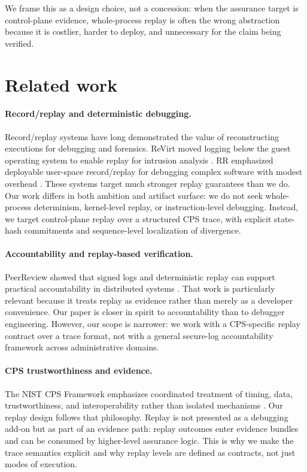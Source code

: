 \documentclass[11pt]{article}
\begin{document}
We frame this as a design choice, not a concession: when the assurance target is control-plane evidence, whole-process replay is often the wrong abstraction because it is costlier, harder to deploy, and unnecessary for the claim being verified.

\section{Related work}

\paragraph{Record/replay and deterministic debugging.}
Record/replay systems have long demonstrated the value of reconstructing executions for debugging and forensics. ReVirt moved logging below the guest operating system to enable replay for intrusion analysis \cite{dunlap2002revirt}. RR emphasized deployable user-space record/replay for debugging complex software with modest overhead \cite{ocallahan2017rr}. These systems target much stronger replay guarantees than we do. Our work differs in both ambition and artifact surface: we do not seek whole-process determinism, kernel-level replay, or instruction-level debugging. Instead, we target control-plane replay over a structured CPS trace, with explicit state-hash commitments and sequence-level localization of divergence.

\paragraph{Accountability and replay-based verification.}
PeerReview showed that signed logs and deterministic replay can support practical accountability in distributed systems \cite{haeberlen2007peerreview}. That work is particularly relevant because it treats replay as evidence rather than merely as a developer convenience. Our paper is closer in spirit to accountability than to debugger engineering. However, our scope is narrower: we work with a CPS-specific replay contract over a trace format, not with a general secure-log accountability framework across administrative domains.

\paragraph{CPS trustworthiness and evidence.}
The NIST CPS Framework emphasizes coordinated treatment of timing, data, trustworthiness, and interoperability rather than isolated mechanisms \cite{nist2017cps}. Our replay design follows that philosophy. Replay is not presented as a debugging add-on but as part of an evidence path: replay outcomes enter evidence bundles and can be consumed by higher-level assurance logic. This is why we make the trace semantics explicit and why replay levels are defined as contracts, not just modes of execution.
\end{document}
